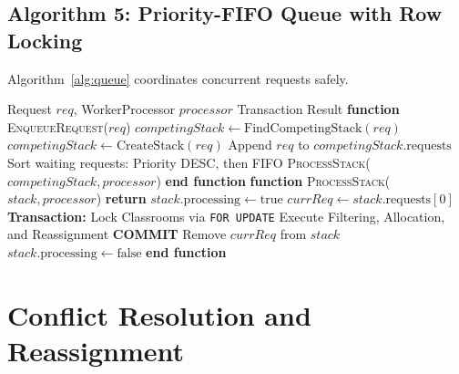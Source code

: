 \documentclass[conference]{IEEEtran}
\begin{document}
\subsection{Algorithm 5: Priority-FIFO Queue with Row Locking}
Algorithm~\ref{alg:queue} coordinates concurrent requests safely.

\begin{algorithm}[t]
\caption{Priority-FIFO Concurrency Controller (\texttt{requestQueue.js})}
\label{alg:queue}
\begin{algorithmic}[1]
\REQUIRE Request $req$, WorkerProcessor $processor$
\ENSURE Transaction Result
\STATE \textbf{function} \textsc{EnqueueRequest}($req$)
\STATE $competingStack \leftarrow \text{FindCompetingStack}(req)$
    \STATE $competingStack \leftarrow \text{CreateStack}(req)$
\ELSE
    \STATE Append $req$ to $competingStack.\text{requests}$
    \STATE Sort waiting requests: Priority DESC, then FIFO
\ENDIF
\STATE \textsc{ProcessStack}($competingStack, processor$)
\STATE \textbf{end function}
\STATE \textbf{function} \textsc{ProcessStack}($stack, processor$)
 \STATE \textbf{return} \ENDIF
\STATE $stack.\text{processing} \leftarrow \text{true}$
    \STATE $currReq \leftarrow stack.\text{requests}[0]$
    \STATE \textbf{Transaction:} Lock Classrooms via \texttt{FOR UPDATE}
    \STATE Execute Filtering, Allocation, and Reassignment
    \STATE \textbf{COMMIT}
    \STATE Remove $currReq$ from $stack$
\ENDWHILE
\STATE $stack.\text{processing} \leftarrow \text{false}$
\STATE \textbf{end function}
\end{algorithmic}
\end{algorithm}

\section{Conflict Resolution and Reassignment}
\end{document}
